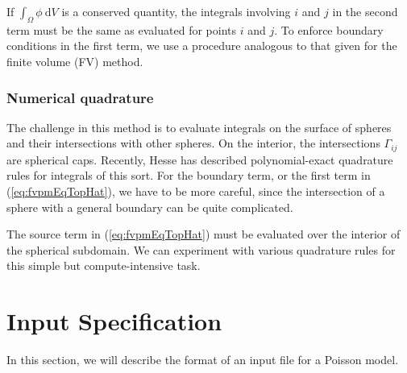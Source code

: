 \documentclass[12pt]{article}
\newcommand{\labelSec}[1]{\label{sec:#1}}
\newcommand{\refEq}[1]{(\ref{eq:#1})}
\newcommand{\dV}{~\mathrm{d}V}
\begin{document}
If $\int_\Omega \phi \dV$ is a conserved quantity, the integrals involving $i$ and $j$ in the second term must be the same as evaluated for 
points $i$ and $j$. To enforce boundary conditions in the first term, we use a procedure analogous to that given for the finite volume (FV) method.

\subsubsection*{Numerical quadrature}

The challenge in this method is to evaluate integrals on the surface of spheres and their intersections with other spheres. On the interior, the 
intersections $\Gamma_{ij}$ are spherical caps. Recently, Hesse has described polynomial-exact quadrature rules for integrals of this sort\cite{Hesse2012}.
For the boundary term, or the first term in \refEq{fvpmEqTopHat}, we have to be more careful, since the intersection of a sphere with a general boundary can 
be quite complicated.

The source term in \refEq{fvpmEqTopHat} must be evaluated over the interior of the spherical subdomain. We can experiment with various 
quadrature rules for this simple but compute-intensive task.

\section{Input Specification}\labelSec{Input}

In this section, we will describe the format of an input file for a Poisson model. 



\end{document}
